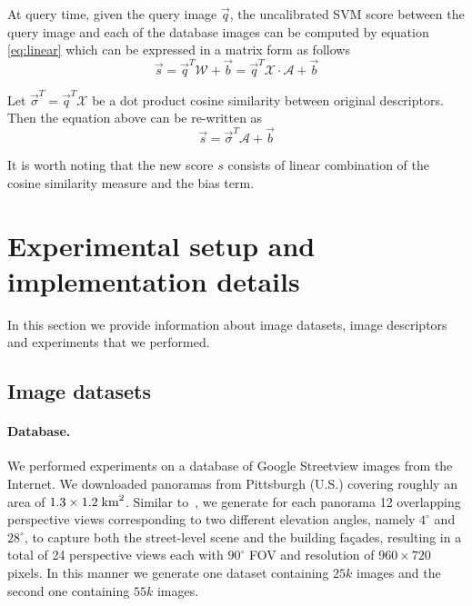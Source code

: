       At query time, given the query image $\vec{q}$, the uncalibrated SVM score between the query image and each of the database images can be computed by equation \eqref{eq:linear} which can be expressed in a matrix form as follows
      \begin{equation}
        \vec{s}=\vec{q}^T \mathcal{W}+\vec{b}=\vec{q}^T \mathcal{X}\cdot \mathcal{A}+\vec{b}
      \end{equation}

      Let $\vec{\sigma}^T=\vec{q}^T \mathcal{X}$ be a dot product cosine similarity between original descriptors. Then the equation above can be re-written as
      \begin{equation}
        \vec{s}=\vec{\sigma}^T \mathcal{A}+\vec{b}
      \end{equation}

      \noindent
      It is worth noting that the new score $s$ consists of linear combination of the cosine similarity measure and the bias term.


\section{Experimental setup and implementation details}
\label{sec:experiments}
   In this section we provide information about image datasets, image descriptors and experiments that we performed.
        \subsection{Image datasets}
        \paragraph{Database.}
        We performed experiments on a database of Google Streetview images from the Internet. We downloaded panoramas from Pittsburgh (U.S.) covering roughly an area of $1.3 \times 1.2 \; {\rm km}^2$. Similar to~\cite{Chen11}, we generate for each panorama 12 overlapping perspective views corresponding to two different elevation angles, namely $4^\circ$ and $28^\circ$, to capture both the street-level scene and the building fa\c{c}ades, resulting in a total of 24 perspective views each with $90^\circ$ FOV and resolution of $960 \times 720$ pixels. In this manner we generate one dataset containing $25k$ images and the second one containing $55k$ images.

